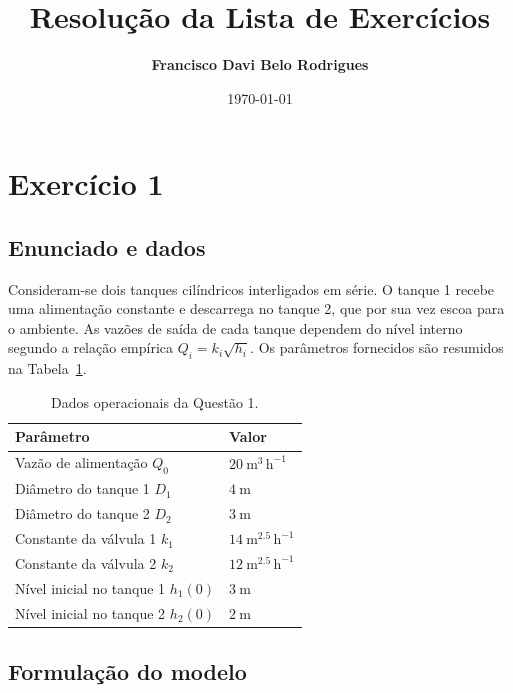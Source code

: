 \documentclass{article}
\title{Resolução da Lista de Exercícios}
\author{\textbf{Francisco Davi Belo Rodrigues}}
\date{\today}
\begin{document}
\fancyhead{}

\maketitle
\thispagestyle{fancy}

\section{Exercício 1}

\subsection*{Enunciado e dados}
Consideram-se dois tanques cilíndricos interligados em série. O tanque 1 recebe uma alimentação constante e descarrega no tanque 2, que por sua vez escoa para o ambiente. As vazões de saída de cada tanque dependem do nível interno segundo a relação empírica $Q_i = k_i\sqrt{h_i}$. Os parâmetros fornecidos são resumidos na Tabela~\ref{tab:dados-q1}.

\begin{table}[ht]
  \centering
  \begin{tabular}{ll}
    \hline
    \textbf{Parâmetro} & \textbf{Valor} \\
    \hline
    Vazão de alimentação $Q_0$ & $20\ \mathrm{m^3\,h^{-1}}$ \\
    Diâmetro do tanque 1 $D_1$ & $4\ \mathrm{m}$ \\
    Diâmetro do tanque 2 $D_2$ & $3\ \mathrm{m}$ \\
    Constante da válvula 1 $k_1$ & $14\ \mathrm{m^{2.5}\,h^{-1}}$ \\
    Constante da válvula 2 $k_2$ & $12\ \mathrm{m^{2.5}\,h^{-1}}$ \\
    Nível inicial no tanque 1 $h_1(0)$ & $3\ \mathrm{m}$ \\
    Nível inicial no tanque 2 $h_2(0)$ & $2\ \mathrm{m}$ \\
    \hline
  \end{tabular}
  \caption{Dados operacionais da Questão 1.}
  \label{tab:dados-q1}
\end{table}

\subsection*{Formulação do modelo}
\end{document}
